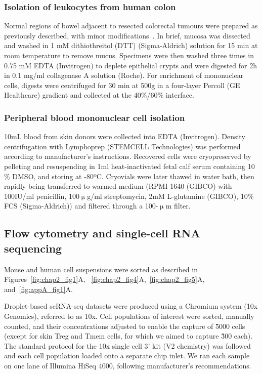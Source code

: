 \subsubsection{Isolation of leukocytes from human colon}
Normal regions of bowel adjacent to resected colorectal tumours were prepared as previously described, with minor modifications~\citep{Bettelli2006-dw,Geremia2011-gr}. In brief, mucosa was dissected and washed in 1 mM dithiothreitol (DTT) (Sigma-Aldrich) solution for 15 min at room temperature to remove mucus. Specimens were then washed three times in 0.75 mM EDTA (Invitrogen) to deplete epithelial crypts and were digested for 2h in 0.1 mg/ml collagenase A solution (Roche). For enrichment of mononuclear cells, digests were centrifuged for 30 min at 500g in a four-layer Percoll (GE Healthcare) gradient and collected at the 40${\%}$/60${\%}$ interface.

\subsubsection{Peripheral blood mononuclear cell isolation}
10mL blood from skin donors were collected into EDTA (Invitrogen). Density centrifugation with Lymphoprep (STEMCELL Technologies) was performed according to manufacturer’s instructions. Recovered cells were cryopreserved by pelleting and resuspending in 1ml heat-inactivated fetal calf serum containing 10${\%}$ DMSO, and storing at -80ºC. Cryovials were later thawed in water bath, then rapidly being transferred to warmed medium (RPMI 1640 (GIBCO) with 100IU/ml penicillin, 100${\upmu}$g/ml streptomycin, 2mM L-glutamine (GIBCO), 10${\%}$ FCS (Sigma-Aldrich)) and filtered through a 100-${\upmu}$m filter.

\subsection{Flow cytometry and single-cell RNA sequencing}
Mouse and human cell suspensions were sorted as described in Figures~\ref{fig:chap2_fig1}A, ~\ref{fig:chap2_fig4}A,~\ref{fig:chap2_fig5}A, and~\ref{fig:appA_fig1}A.

Droplet-based scRNA-seq datasets were produced using a Chromium system (10x Genomics), referred to as 10x. Cell populations of interest were sorted, manually counted, and their concentrations adjusted to enable the capture of \~5000 cells (except for skin Treg and Tmem cells, for which we aimed to capture \~300 each). The standard protocol for the 10x single cell 3’ kit (V2 chemistry) was followed and each cell population loaded onto a separate chip inlet. We ran each sample on one lane of Illumina HiSeq 4000, following manufacturer’s recommendations.

